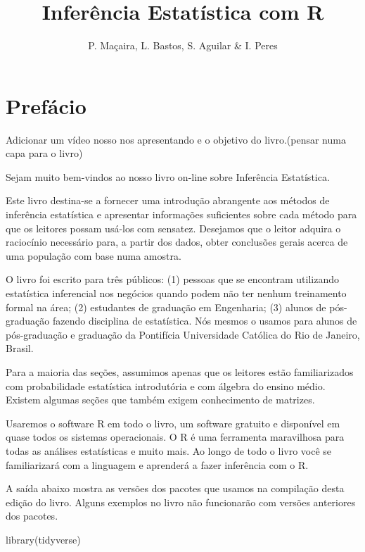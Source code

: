 \documentclass[
]{book}
\title{Inferência Estatística com R}
\author{P. Maçaira, L. Bastos, S. Aguilar \& I. Peres}
\date{}
\newenvironment{Shaded}{\begin{snugshade}}{\end{snugshade}}
\newcommand{\FunctionTok}[1]{\textcolor[rgb]{0.00,0.00,0.00}{#1}}
\newcommand{\NormalTok}[1]{#1}
\begin{document}
\maketitle

{
\setcounter{tocdepth}{1}
\tableofcontents
}
\hypertarget{prefuxe1cio}{%
\chapter*{Prefácio}\label{prefuxe1cio}}

Adicionar um vídeo nosso nos apresentando e o objetivo do livro.(pensar numa capa para o livro)

Sejam muito bem-vindos ao nosso livro on-line sobre Inferência Estatística.

Este livro destina-se a fornecer uma introdução abrangente aos métodos de inferência estatística e apresentar informações suficientes sobre cada método para que os leitores possam usá-los com sensatez. Desejamos que o leitor adquira o raciocínio necessário para, a partir dos dados,
obter conclusões gerais acerca de uma população com base numa amostra.

O livro foi escrito para três públicos: (1) pessoas que se encontram utilizando estatística inferencial nos negócios quando podem não ter nenhum treinamento formal na área; (2) estudantes de graduação em Engenharia; (3) alunos de pós-graduação fazendo disciplina de estatística. Nós mesmos o usamos para alunos de pós-graduação e graduação da Pontifícia Universidade Católica do Rio de Janeiro, Brasil.

Para a maioria das seções, assumimos apenas que os leitores estão familiarizados com probabilidade estatística introdutória e com álgebra do ensino médio. Existem algumas seções que também exigem conhecimento de matrizes.

Usaremos o software R em todo o livro, um software gratuito e disponível em quase todos os sistemas operacionais. O R é uma ferramenta maravilhosa para todas as análises estatísticas e muito mais. Ao longo de todo o livro você se familiarizará com a linguagem e aprenderá a fazer inferência com o R.

A saída abaixo mostra as versões dos pacotes que usamos na compilação desta edição do livro. Alguns exemplos no livro não funcionarão com versões anteriores dos pacotes.

\begin{Shaded}
\begin{Highlighting}[]
\FunctionTok{library}\NormalTok{(tidyverse)}
\end{Highlighting}
\end{Shaded}
\end{document}
